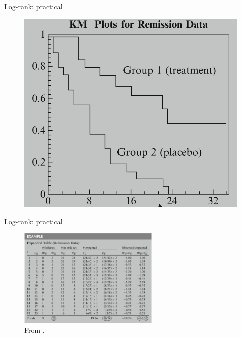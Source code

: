 \documentclass[12pt,english,pdf,xcolor=dvipsnames,aspectratio=169]{beamer}\usepackage[]{graphicx}\usepackage[]{xcolor}
\begin{document}
\begin{frame}{Log-rank: practical}
\begin{figure}
\hspace{0.33cm}
\includegraphics[height=0.8\textheight]{../03-graphs/01-09.png}
\end{figure}
\end{frame}


\begin{frame}{Log-rank: practical}

\begin{figure}
\centering
\includegraphics[width=0.6\textwidth]{../03-graphs/01-06.png}
\caption*{From .}
\end{figure}

\end{frame}
\end{document}
